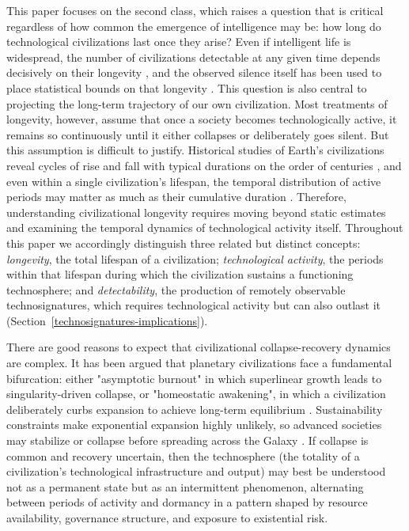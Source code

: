 This paper focuses on the second class, which raises a question that is critical regardless of how common the emergence of intelligence may be: how long do technological civilizations last once they arise? Even if intelligent life is widespread, the number of civilizations detectable at any given time depends decisively on their longevity \citep{Balbi2021-bc}, and the observed silence itself has been used to place statistical bounds on that longevity \citep{Rahvar2026-lt}. This question is also central to projecting the long-term trajectory of our own civilization. Most treatments of longevity, however, assume that once a society becomes technologically active, it remains so continuously until it either collapses or deliberately goes silent. But this assumption is difficult to justify. Historical studies of Earth's civilizations reveal cycles of rise and fall with typical durations on the order of centuries \citep{Shermer2002-oi}, and even within a single civilization's lifespan, the temporal distribution of active periods may matter as much as their cumulative duration \citep{Balbi2018-fp}. Therefore, understanding civilizational longevity requires moving beyond static estimates and examining the temporal dynamics of technological activity itself. Throughout this paper we accordingly distinguish three related but distinct concepts: \emph{longevity}, the total lifespan of a civilization; \emph{technological activity}, the periods within that lifespan during which the civilization sustains a functioning technosphere; and \emph{detectability}, the production of remotely observable technosignatures, which requires technological activity but can also outlast it (Section~\ref{technosignatures-implications}).

There are good reasons to expect that civilizational collapse-recovery dynamics are complex. It has been argued that planetary civilizations face a fundamental bifurcation: either "asymptotic burnout" in which superlinear growth leads to singularity-driven collapse, or "homeostatic awakening", in which a civilization deliberately curbs expansion to achieve long-term equilibrium \citep{Wong2022-hv}. Sustainability constraints make exponential expansion highly unlikely, so advanced societies may stabilize or collapse before spreading across the Galaxy \citep{Haqq-Misra2009-jb,mullan2019population}. If collapse is common and recovery uncertain, then the technosphere (the totality of a civilization's technological infrastructure and output) may best be understood not as a permanent state but as an intermittent phenomenon, alternating between periods of activity and dormancy in a pattern shaped by resource availability, governance structure, and exposure to existential risk.

